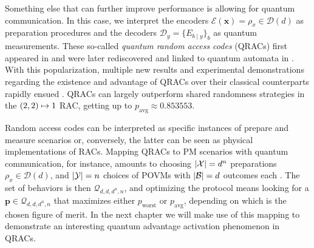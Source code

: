 
            Something else that can further improve performance is allowing for quantum communication. In this case, we interpret the encoders $\mathcal{E}(\mathbf{x}) = \rho_x \in \mathcal{D}(d)$ as preparation procedures and the decoders $\mathcal{D}_y = \{ E_{b \mid y} \}_b$ as quantum measurements. These so-called \emph{quantum random access codes} (QRACs) first appeared in \cite{wiesner1983conjugate} and were later rediscovered and linked to quantum automata in \cite{ambainis_qracsoriginal_1999}. With this popularization, multiple new results and experimental demonstrations regarding the existence and advantage of QRACs over their classical counterparts rapidly ensued \cite{nayak1999optimal,ambainis2002dense,hayashi_41qracs_2006,ambainis_srqracs_2009,spekkens2009preparation,pawlowski_pamqkd_2011}. QRACs can largely outperform shared randomness strategies in the $\left( 2, 2 \right) \mapsto 1$ RAC, getting up to $p_{\text{avg}} \approx 0.853553$.

            Random access codes can be interpreted as specific instances of prepare and measure scenarios or, conversely, the latter can be seen as physical implementations of RACs. Mapping QRACs to PM scenarios with quantum communication, for instance, amounts to choosing $\abs{\mathcal{X}} = d^n$ preparations $\rho_{x} \in \mathcal{D}(d)$, and $\abs{\mathcal{Y}} = n$  choices of POVMs with $\abs{\mathcal{B}} = d$ outcomes each \cite{de_vicente_bound_2019}. The set of behaviors is then $\mathcal{Q}_{d,d,d^n,n}$, and optimizing the protocol means looking for a $\mathbf{p} \in \mathcal{Q}_{d,d,d^n,n}$ that maximizes either $p_{\text{worst}}$ or $p_{\text{avg}}$, depending on which is the chosen figure of merit. In the next chapter we will make use of this mapping to demonstrate an interesting quantum advantage activation phenomenon in QRACs.

